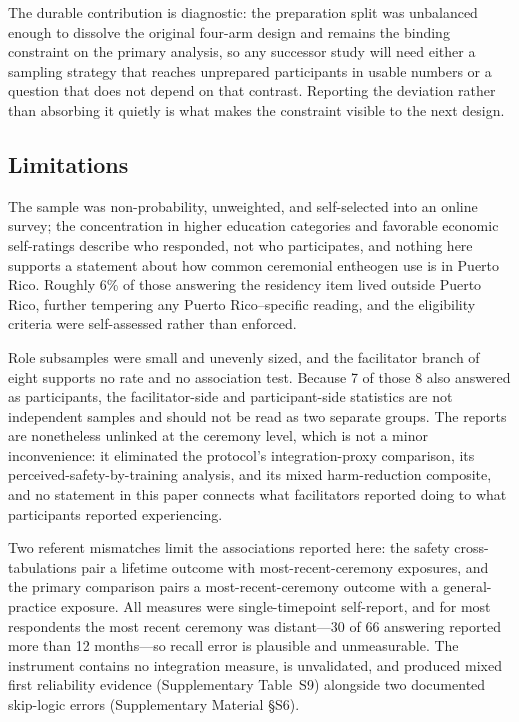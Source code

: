 \documentclass[12pt]{article}
\begin{document}
The durable contribution is diagnostic: the preparation split was unbalanced enough to dissolve the
original four-arm design and remains the binding constraint on the primary analysis, so any successor study
will need either a sampling strategy that reaches unprepared participants in usable numbers or a question
that does not depend on that contrast. Reporting the deviation rather than absorbing it quietly is what
makes the constraint visible to the next design.

\subsection{Limitations}

The sample was non-probability, unweighted, and self-selected into an online survey; the concentration in
higher education categories and favorable economic self-ratings describe who responded, not who
participates, and nothing here supports a statement about how common ceremonial entheogen use is in Puerto
Rico. Roughly 6\% of those answering the residency item lived outside Puerto Rico, further tempering any
Puerto Rico--specific reading, and the eligibility criteria were self-assessed rather than enforced.

Role subsamples were small and unevenly sized, and the facilitator branch of eight supports no rate and no
association test. Because 7 of those 8 also answered as participants, the facilitator-side and
participant-side statistics are not independent samples and should not be read as two separate groups. The
reports are nonetheless unlinked at the ceremony level, which is not a minor inconvenience: it eliminated
the protocol's integration-proxy comparison, its perceived-safety-by-training analysis, and its mixed
harm-reduction composite, and no statement in this paper connects what facilitators reported doing to what
participants reported experiencing.

Two referent mismatches limit the associations reported here: the safety cross-tabulations pair a lifetime
outcome with most-recent-ceremony exposures, and the primary comparison pairs a most-recent-ceremony
outcome with a general-practice exposure. All measures were single-timepoint self-report, and for most
respondents the most recent ceremony was distant---30 of 66 answering reported more than 12 months---so
recall error is plausible and unmeasurable. The instrument contains no integration measure, is unvalidated,
and produced mixed first reliability evidence (Supplementary Table~S9) alongside two documented skip-logic
errors (Supplementary Material \S S6).
\end{document}
